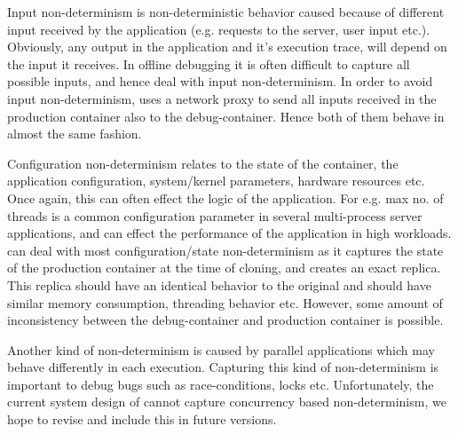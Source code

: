 Input non-determinism is non-deterministic behavior caused because of different input received by the application (e.g. requests to the server, user input etc.). 
Obviously, any output in the application and it's execution trace, will depend on the input it receives. 
In offline debugging it is often difficult to capture all possible inputs, and hence deal with input non-determinism.
In order to avoid input non-determinism, \parikshan uses a network proxy to send all inputs received in the production container also to the debug-container. 
Hence both of them behave in almost the same fashion.

Configuration non-determinism relates to the state of the container, the application configuration, system/kernel parameters, hardware resources etc.
Once again, this can often effect the logic of the application.
For e.g. max no. of threads is a common configuration parameter in several multi-process server applications, and can effect the performance of the application in high workloads.
\parikshan can deal with most configuration/state non-determinism as it captures the state of the production container at the time of cloning, and creates an exact replica.
This replica should have an identical behavior to the original and should have similar memory consumption, threading behavior etc. 
However, some amount of inconsistency between the debug-container and production container is possible.

Another kind of non-determinism is caused by parallel applications which may behave differently in each execution.
Capturing this kind of non-determinism is important to debug bugs such as race-conditions, locks etc.
Unfortunately, the current system design of \parikshan cannot capture concurrency based non-determinism, we hope to revise and include this in future versions.
